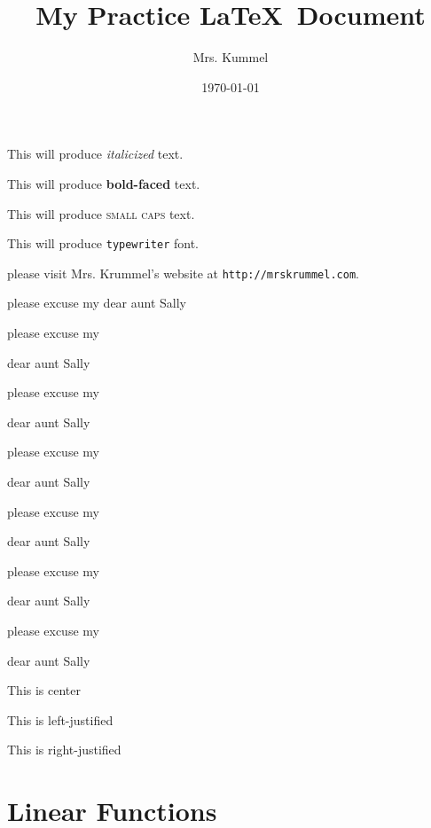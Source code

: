 \documentclass[11pt]{article}
\begin{document}
\tableofcontents

\title{My Practice \LaTeX \ Document}
\author{Mrs. Kummel}
\date{\today}
\maketitle

This will produce \textit{italicized} text.

This will produce \textbf{bold-faced} text.

This will produce \textsc{small caps} text.

This will produce \texttt{typewriter} font.

please visit Mrs. Krummel's website at \texttt{http://mrskrummel.com}.

please excuse my dear aunt Sally

please excuse my \begin{large}
dear aunt Sally
\end{large}

please excuse my \begin{Large}
dear aunt Sally
\end{Large}

please excuse my \begin{huge}
dear aunt Sally
\end{huge}

please excuse my \begin{Huge}
dear aunt Sally
\end{Huge}

please excuse my \begin{small}
dear aunt Sally
\end{small}

please excuse my \begin{tiny}
dear aunt Sally
\end{tiny}

\begin{center}
This is center
\end{center}

\begin{flushleft}
This is left-justified
\end{flushleft}

\begin{flushright}
This is right-justified
\end{flushright}

\section{Linear Functions}
\end{document}
